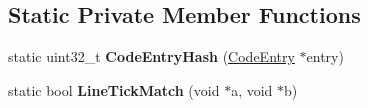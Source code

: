 \subsection*{Static Private Member Functions}
\begin{DoxyCompactItemize}
\item 
static uint32\+\_\+t {\bfseries Code\+Entry\+Hash} (\hyperlink{classv8_1_1internal_1_1_code_entry}{Code\+Entry} $\ast$entry)\hypertarget{classv8_1_1internal_1_1_profile_node_ae664b35f3a67be5488e3cf9914b6bcb4}{}\label{classv8_1_1internal_1_1_profile_node_ae664b35f3a67be5488e3cf9914b6bcb4}

\item 
static bool {\bfseries Line\+Tick\+Match} (void $\ast$a, void $\ast$b)\hypertarget{classv8_1_1internal_1_1_profile_node_ae44a389e8328f7e1540363dd5ccb0daa}{}\label{classv8_1_1internal_1_1_profile_node_ae44a389e8328f7e1540363dd5ccb0daa}

\end{DoxyCompactItemize}
